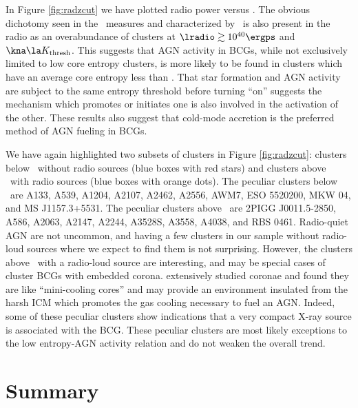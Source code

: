 \documentclass{emulateapj}
\begin{document}
In Figure \ref{fig:radzcut} we have plotted radio power versus \kna.
The obvious dichotomy seen in the \halpha\ measures and characterized
by \kthr\, is also present in the radio as an overabundance of
clusters at $\lradio \gtrsim 10^{40} \ergps$ and $\kna \la \kthr$.
This suggests that AGN activity in BCGs, while not exclusively limited
to low core entropy clusters, is more likely to be found in clusters
which have an average core entropy less than \kthr. That star
formation and AGN activity are subject to the same entropy threshold
before turning ``on'' suggests the mechanism which promotes or
initiates one is also involved in the activation of the other. These
results also suggest that cold-mode accretion \citep{pizzolato05,
  hardcastle07} is the preferred method of AGN fueling in BCGs.

We have again highlighted two subsets of clusters in Figure
\ref{fig:radzcut}: clusters below \kthr\ without radio sources (blue
boxes with red stars) and clusters above \kthr\ with radio sources
(blue boxes with orange dots). The peculiar clusters below \kthr\ are
A133, A539, A1204, A2107, A2462, A2556, AWM7, ESO 5520200, MKW 04, and
MS J1157.3+5531. The peculiar clusters above \kthr\ are 2PIGG
J0011.5-2850, A586, A2063, A2147, A2244, A3528S, A3558, A4038, and RBS
0461. Radio-quiet AGN are not uncommon, and having a few clusters in
our sample without radio-loud sources where we expect to find them is
not surprising. However, the clusters above \kthr\ with a radio-loud
source are interesting, and may be special cases of cluster BCGs with
embedded corona. \cite{coronae} extensively studied coronae and found
they are like ``mini-cooling cores'' and may provide an environment
insulated from the harsh ICM which promotes the gas cooling necessary
to fuel an AGN. Indeed, some of these peculiar clusters show
indications that a very compact X-ray source is associated with the
BCG. These peculiar clusters are most likely exceptions to the low
entropy-AGN activity relation and do not weaken the overall trend.

\section{Summary}
\label{sec:diss}
\end{document}
